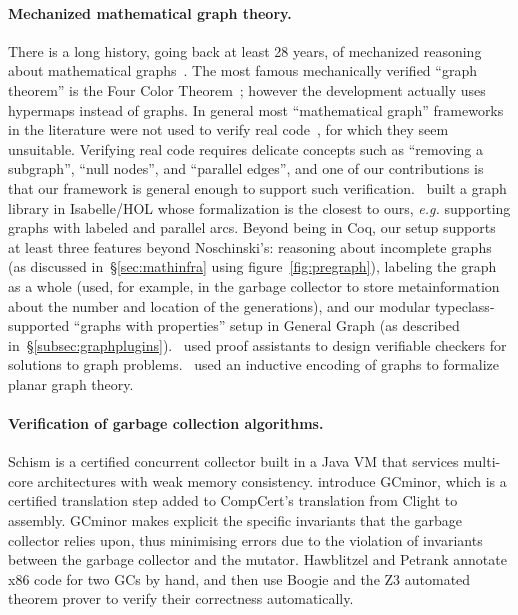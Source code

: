 \paragraph{Mechanized mathematical graph theory.}
There is a long history, going back at least 28 years, of mechanized 
reasoning about mathematical graphs~\cite{wong1991}. 
The most famous mechanically verified “graph theorem” is the Four Color 
Theorem~\cite{gonthier2005computer}; however the development actually uses
hypermaps instead of graphs. In general most “mathematical graph” frameworks in 
the literature were not used to verify real 
code~\cite{wong1991, chou1994, yamamoto1995formalization, rwpgt1998, yamamoto1998formalization, tamai2000formal, duprat2001coq, ridge2005graphs, nipkow2016, dijkstra_shortest_path-afp}, for which they seem unsuitable. Verifying real code requires delicate concepts such as “removing a subgraph”, “null nodes”, and “parallel edges”, and one of our contributions is that our framework is general enough to support such verification. 
\cite{noschinski2015}~built a graph library in Isabelle/HOL whose formalization 
is the closest to ours, 
\emph{e.g.} supporting graphs with labeled and parallel arcs. 
Beyond being in Coq, our setup supports at least three features beyond 
Noschinski’s: reasoning about incomplete graphs (as discussed 
in~\S\ref{sec:mathinfra} using figure~\ref{fig:pregraph}), labeling the graph 
as a whole (used, for example, in the garbage collector to store 
metainformation about the number and location of the generations), and our 
modular typeclass-supported “graphs with properties” setup in General Graph 
(as described in~\S\ref{subsec:graphplugins}). 
\cite{noschinski2015formalizing,dubois2015graphes}~used proof assistants to 
design verifiable checkers for solutions to graph problems. 
\cite{yamamoto1995formalization,bauer20025}~used an inductive encoding of graphs to formalize planar graph theory.


\paragraph{Verification of garbage collection algorithms.}
Schism \cite{gcexample4,gcexample4a} is a certified concurrent
collector built in a Java VM that services multi-core architectures with weak memory consistency.
\cite{gcexample5, gcexample3} introduce GCminor, which is
a certified translation step added to CompCert's translation from Clight to assembly.
GCminor makes explicit the specific invariants that the garbage collector
relies upon, thus minimising errors due to the violation of invariants
between the garbage collector and the mutator.
Hawblitzel and Petrank \cite{gcexample2} annotate x86 code
for two GCs by hand, and then use Boogie and the Z3 automated theorem prover
to verify their correctness automatically.

